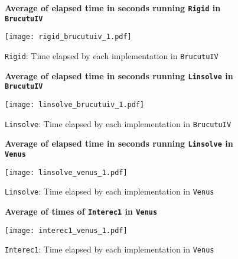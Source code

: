 \begin{figure}[ht]
\textbf{Average of elapsed time in seconds running \texttt{Rigid} in \texttt{BrucutuIV}}\par\medskip
\centering
\texttt{[image: rigid\_brucutuiv\_1.pdf]}
\caption{\texttt{Rigid}: Time elapsed by each implementation in \texttt{BrucutuIV}}
\label{fig:rigid_brucutuiv_1}
\end{figure}

\begin{figure}[ht]
\centering
\textbf{Average of elapsed time in seconds running \texttt{Linsolve} in \texttt{BrucutuIV}}\par\medskip
\texttt{[image: linsolve\_brucutuiv\_1.pdf]}
\caption{\texttt{Linsolve}: Time elapsed by each implementation in \texttt{BrucutuIV}}
\label{fig:linsolve_brucutuiv_1}
\end{figure}

\begin{figure}[ht]
\centering
\textbf{Average of elapsed time in seconds running \texttt{Linsolve} in \texttt{Venus}}\par\medskip
\texttt{[image: linsolve\_venus\_1.pdf]}
\caption{\texttt{Linsolve}: Time elapsed by each implementation in \texttt{Venus}}
\label{fig:linsolve_venus_1}
\end{figure}

\begin{figure}[ht]
\centering
\textbf{Average of times of \texttt{Interec1} in \texttt{Venus}}\par\medskip
\texttt{[image: interec1\_venus\_1.pdf]}
\caption{\texttt{Interec1}: Time elapsed by each implementation in \texttt{Venus}}
\label{fig:interec1_venus_1}
\end{figure}
